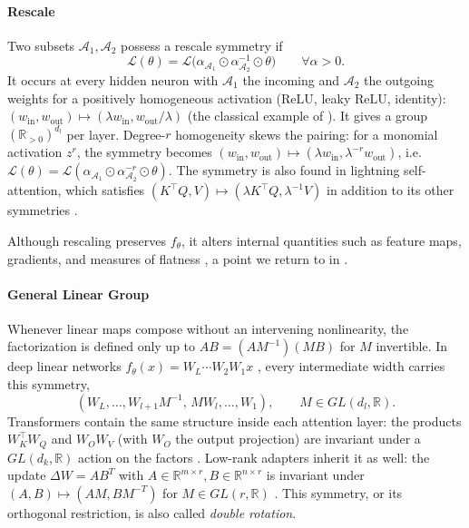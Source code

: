 \documentclass[mathematics,review,submit,moreauthors]{Definitions/mdpi}
\begin{document}
\paragraph{Rescale}
Two subsets $\mathcal{A}_1,\mathcal{A}_2$ possess a rescale symmetry if \citep{kunin2020}
\begin{equation*}
    \mathcal{L}(\theta)=\mathcal{L}\big(\alpha_{\mathcal{A}_1}\odot\alpha_{\mathcal{A}_2}^{-1}\odot\theta\big) \qquad \forall\alpha>0.
\end{equation*}
It occurs at every hidden neuron with $\mathcal{A}_1$ the incoming and $\mathcal{A}_2$ the outgoing weights for a positively homogeneous activation ($\mathrm{ReLU}$, leaky $\mathrm{ReLU}$, identity): $(w_{\mathrm{in}},w_{\mathrm{out}})\mapsto(\lambda w_{\mathrm{in}},w_{\mathrm{out}}/\lambda)$ (the classical example of ).
It gives a group $(\mathbb{R}_{>0})^{d_l}$ per layer.
Degree-$r$ homogeneity skews the pairing: for a monomial activation $z^r$, the symmetry becomes $(w_{\mathrm{in}},w_{\mathrm{out}})\mapsto(\lambda w_{\mathrm{in}},\lambda^{-r}w_{\mathrm{out}})$, i.e.\ $\mathcal{L}(\theta)=\mathcal{L}(\alpha_{\mathcal{A}_1}\odot\alpha_{\mathcal{A}_2}^{-r}\odot\theta)$.
The symmetry is also found in lightning self-attention, which satisfies $(K^{\top}Q,V)\mapsto(\lambda K^{\top}Q,\lambda^{-1}V)$ in addition to its other symmetries \citep{henry2025}.

Although rescaling preserves $f_\theta$, it alters internal quantities such as feature maps, gradients, and measures of flatness \citep{armenta2021b}, a point we return to in .

\paragraph{General Linear Group}
Whenever linear maps compose without an intervening nonlinearity, the factorization is defined only up to $AB=(AM^{-1})(MB)$ for $M$ invertible.
In deep linear networks $f_\theta(x)=W_L\cdots W_2W_1x$ \citep{saxe2014piclr2}, every intermediate width carries this symmetry,
\begin{equation*}
    (W_L,\dots,W_{l+1}M^{-1},\,MW_l,\dots,W_1), \qquad M\in GL(d_l,\mathbb{R}).
\end{equation*}
Transformers contain the same structure inside each attention layer: the products $W_K^{\top}W_Q$ and $W_OW_V$ (with $W_O$ the output projection) are invariant under a $GL(d_k,\mathbb{R})$ action on the factors \citep{kobayashi2024anips}.
Low-rank adapters \citep[LoRA,][]{hu2021} inherit it as well: the update $\Delta W=AB^T$ with $A\in \mathbb R^{m\times r}, B\in \mathbb R^{n\times r}$ is invariant under $(A, B)\mapsto(AM, BM^{-T})$ for $M\in GL(r,\mathbb{R})$ \citep{yen2025iclr}.
This symmetry, or its orthogonal restriction, is also called \emph{double rotation}.
\end{document}
